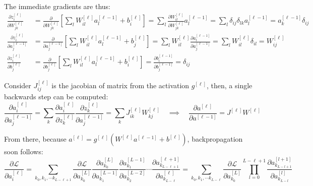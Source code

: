 \documentclass[a4paper, 12pt]{report}
\begin{document}
The immediate gradients are thus:
\begin{equation}
\begin{array}{ll}
\displaystyle\frac{\partial z_i^{[\ell]}}{\partial W^{[\ell]}_{jk}}
&=\displaystyle\frac{\partial}{\partial W^{[\ell]}_{jk}}\left[\sum_l W^{[\ell]}_{il} a^{[\ell-1]}_{l}+b^{[\ell]}_i\right]
=\displaystyle\sum_l\frac{\partial W^{[\ell]}_{il}}{\partial W^{[\ell]}_{jk}} a^{[\ell-1]}_{l}
=\displaystyle\sum_l\delta_{ij}\delta_{lk} a^{[\ell-1]}_{l} = a^{[\ell-1]}_k\delta_{ij}
\\
\displaystyle\frac{\partial z^{[\ell]}_i}{\partial a^{[\ell-1]}_j}
&=\displaystyle\frac{\partial}{\partial a^{[\ell-1]}_j}\left[\sum_l W^{[\ell]}_{il} a^{[\ell-1]}_l + b^{[\ell]}_j\right]
= \displaystyle\sum_l W_{il}^{[\ell]}\frac{\partial a_l^{[\ell-1]}}{\partial a_j^{[\ell-1]}}
= \displaystyle\sum_l W_{il}^{[\ell]}\delta_{il}
= W_{ij}^{[\ell]}
\\
\displaystyle\frac{\partial z^{[\ell]}_i}{\partial b^{[\ell]}_j}
&=\displaystyle\frac{\partial}{\partial b^{[\ell]}_j}\left[\sum_l W^{[\ell]}_{il} a^{[\ell-1]}_l + b^{[\ell]}_i\right]
= \displaystyle\frac{\partial b_i^{[\ell-1]}}{\partial b_j^{[\ell-1]}}
= \displaystyle\delta_{ij}
\end{array}
\end{equation}


Consider $J_{ij}^{[\ell]}$ is the jacobian of matrix from the activation $g^{[\ell]}$, then, a single backwards step can be computed:
\begin{equation}
\frac{\partial a_i^{[\ell]}}{\partial a_j^{[\ell-1]}}
=\sum_k\frac{\partial a_i^{[\ell]}}{\partial z_k^{[\ell]}}\frac{\partial z_k^{[\ell]}}{\partial a_j^{[\ell-1]}}
=\sum_k J_{ik}^{[\ell]} W_{kj}^{[\ell]}
\quad\implies\quad
\frac{\partial a^{[\ell]}}{\partial a^{[\ell-1]}} = J^{[\ell]} W^{[\ell]}
\end{equation}


From there, because $a^{[\ell]} = g^{[\ell]}\left(W^{[\ell]} a^{[\ell-1]} + b^{[\ell]}\right)$, backpropagation soon follows:
\begin{equation}
\frac{\partial\mathcal L}{\partial a_i^{[\ell]}} = 
\sum_{k_0,k_1,\cdots k_{L-\ell+1}}
\frac{\partial\mathcal L}{\partial a_{k_0}^{[L]}}
\frac{\partial a_{k_0}^{[L]}}{\partial a_{k_1}^{[L-1]}}
\frac{\partial a_{k_1}^{[L-1]}}{\partial a_{k_2}^{[L-2]}}
\cdots
\frac{\partial a_{k_{L-\ell+1}}^{[\ell+1]}}{\partial a_{k_{L-\ell}}^{[\ell]}}
=
\sum_{k_0,k_1,\cdots k_{L-\ell}}
\frac{\partial\mathcal L}{\partial a_{k_0}^{[L]}}
\prod_{l=0}^{L-\ell+1}
\frac{\partial a_{k_{L-l+1}}^{[l+1]}}{\partial a_{k_{L-l}}^{[l]}}
\end{equation}
\end{document}
